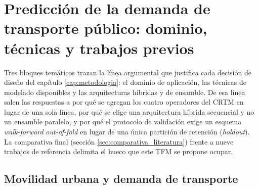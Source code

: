 \chapter{Predicción de la demanda de transporte público: dominio, técnicas y trabajos previos}\label{cap:estado_arte}

Tres bloques temáticos trazan la línea argumental que justifica cada decisión de diseño
del capítulo \ref{cap:metodologia}: el dominio de aplicación, las técnicas de modelado
disponibles y las arquitecturas híbridas y de ensamble. De esa línea salen las respuestas
a por qué se agregan los cuatro operadores del CRTM en lugar de una sola línea, por qué se
elige una arquitectura híbrida secuencial y no un ensamble paralelo, y por qué el
protocolo de validación exige un esquema \emph{walk-forward} \emph{out-of-fold} en lugar
de una única partición de retención (\emph{holdout}). La comparativa final (sección
\ref{sec:comparativa_literatura}) frente a nueve trabajos de referencia delimita el hueco
que este TFM se propone ocupar.

\section{Movilidad urbana y demanda de transporte}\label{sec:movilidad_urbana}


